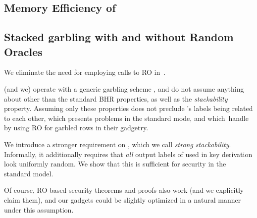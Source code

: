

\subsection{Memory Efficiency of \ourschemelong}
\label{sec:memoryEfficiency}





\subsection{Stacked garbling with and without Random Oracles}
\label{sec:techOverviewRO}


We eliminate the need for employing calls to RO in~\HK.   

\HK (and we) operate with a generic garbling scheme \underscheme, and do not assume anything about \underscheme other than the standard BHR properties, as well as the {\em stackability} property.  Assuming only  these properties does not preclude \underscheme's labels being related to each other, which presents problems in the standard mode, and which~\HK handle by using RO for garbled rows in their gadgetry.

We introduce a stronger requirement on \underscheme, which we call {\em strong stackability}.  Informally, it additionally requires that {\em all} output labels of \underscheme used in key derivation look uniformly random.  We show that this is sufficient for security in the standard model.

Of course, RO-based security theorems and proofs also work (and we explicitly claim them), and our gadgets could be slightly optimized in a natural manner under this assumption.






